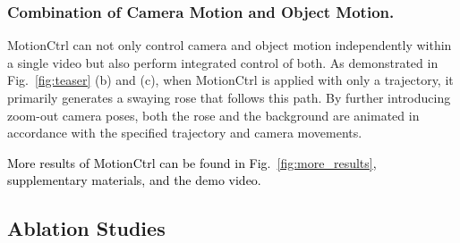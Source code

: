 \documentclass[sigconf]{acmart}
\begin{document}
\subsubsection{Combination of Camera Motion and Object Motion.} MotionCtrl can not only control camera and object motion independently within a single video but also perform integrated control of both. As demonstrated in Fig.~\ref{fig:teaser} (b) and (c), when MotionCtrl is applied with only a trajectory, it primarily generates a swaying rose that follows this path. By further introducing zoom-out camera poses, both the rose and the background are animated in accordance with the specified trajectory and camera movements. 

\textcolor{black}{
More results of MotionCtrl can be found in Fig.~\ref{fig:more_results}, supplementary materials, and the demo video.
}

\begin{table}
  \renewcommand{\arraystretch}{1.2}
  \centering
  \caption{\textbf{Ablation of Camera Motion Control.} Our Camera Motion Control Module (CMCM), incorporated with the temporal transformers of  LVDM~\cite{he2022lvdm}, effectively controls camera motion and maintains LVDM's video quality.}
  \vspace{-0.3cm}
  \vspace{-12pt}
  \label{tab:camera_motion}
\end{table}



\subsection{Ablation Studies}
\end{document}

